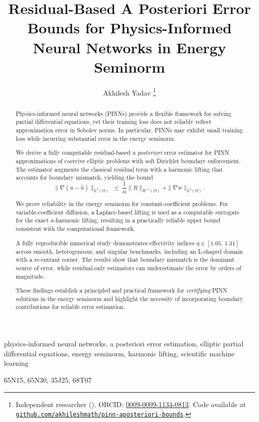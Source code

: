 \documentclass{siamart251216}
\title{Residual-Based A Posteriori Error Bounds for Physics-Informed Neural Networks in Energy Seminorm}
\author{
Akhilesh Yadav%
\thanks{Independent researcher (\email{akhileshyadav.maths@gmail.com}).
ORCID: \href{https://orcid.org/0009-0009-1134-0813}{0009-0009-1134-0813}.
Code available at
\href{https://github.com/akhileshmath/pinn-aposteriori-bounds}
{\texttt{github.com/akhileshmath/pinn-aposteriori-bounds}}.}
}
\date{}
\begin{document}
\maketitle

\begin{abstract}
Physics-informed neural networks (PINNs) provide a flexible framework for
solving partial differential equations, yet their training loss does not
reliably reflect approximation error in Sobolev norms. In particular,
PINNs may exhibit small training loss while incurring substantial error
in the energy seminorm.

We derive a fully computable residual-based \emph{a posteriori} error estimator
for PINN approximations of coercive elliptic problems with soft Dirichlet
boundary enforcement. The estimator augments the classical residual term
with a harmonic lifting that accounts for boundary mismatch, yielding the bound
\[
\|\nabla(u - \hat{u})\|_{L^2(\Omega)}
\;\le\;
\frac{1}{\alpha}\|R\|_{H^{-1}(\Omega)}
+
\|\nabla w\|_{L^2(\Omega)}.
\]

We prove reliability in the energy seminorm for constant-coefficient problems.
For variable-coefficient diffusion, a Laplace-based lifting is used as a
computable surrogate for the exact $a$-harmonic lifting, resulting in a
practically reliable upper bound consistent with the computational framework.

A fully reproducible numerical study demonstrates effectivity indices
$\eta \in [1.05,\,1.31]$ across smooth, heterogeneous, and singular benchmarks,
including an L-shaped domain with a re-entrant corner. The results show that
boundary mismatch is the dominant source of error, while residual-only
estimators can underestimate the error by orders of magnitude.

These findings establish a principled and practical framework for
\emph{certifying} PINN solutions in the energy seminorm and highlight the
necessity of incorporating boundary contributions for reliable error estimation.
\end{abstract}

\begin{keywords}
physics-informed neural networks,
a posteriori error estimation,
elliptic partial differential equations,
energy seminorm,
harmonic lifting,
scientific machine learning
\end{keywords}

\begin{MSCcodes}
65N15, 65N30, 35J25, 68T07
\end{MSCcodes}
\end{document}
